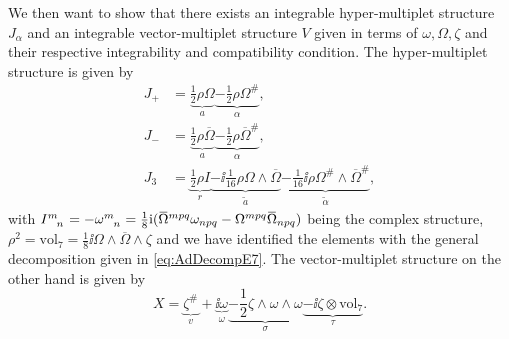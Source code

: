 
We then want to show that there exists an integrable hyper-multiplet structure $J_\alpha$ and an integrable vector-multiplet structure $V$ given in terms of ${\omega,\Omega,\zeta}$ and their respective integrability and compatibility condition. The hyper-multiplet structure is given by
\begin{equation}
    \begin{aligned}
        J_+ &= \underbrace{\frac{1}{2}\rho\Omega}_{a} \underbrace{-\frac{1}{2}\rho\Omega^{\#}}_{\alpha},\\
        J_- &= \underbrace{\frac{1}{2}\rho\overbar{\Omega}}_{a} \underbrace{-\frac{1}{2}\rho\overbar{\Omega}^{\#}}_{\alpha},\\
        J_3 &= \underbrace{\frac{1}{2}\rho I}_{r}\underbrace{-\ii\frac{1}{16}\rho\Omega\wedge\overbar{\Omega}}_{\tilde{a}}\underbrace{-\frac{1}{16}\ii\rho\Omega^{\#}\wedge\overbar{\Omega}^{\#}}_{\tilde{\alpha}},
    \end{aligned}
\end{equation}
with $\tensor{I}{^m_n}=-\tensor{\omega}{^m_n}=\frac{1}{8}\ii (\overbar{\Omega}^{mpq}\omega_{npq}-\Omega^{mpq}\overbar{\Omega}_{npq})$ being the complex structure, $\rho^2=\text{vol}_7=\frac{1}{8}\ii\Omega\wedge\overbar{\Omega}\wedge\zeta$ and we have identified the elements with the general decomposition given in \eqref{eq:AdDecompE7}. The vector-multiplet structure on the other hand is given by 
\begin{equation}
    X = \underbrace{\zeta^{\#}}_{v}+\underbrace{\ii\omega}_{\omega}\underbrace{-\frac{1}{2}\zeta\wedge\omega\wedge\omega}_{\sigma}\underbrace{-\ii\zeta\otimes\text{vol}_7}_{\tau}.
\end{equation}


